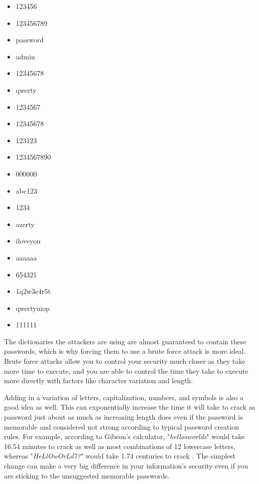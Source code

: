 \documentclass[acmsmall,nonacm]{acmart}
\begin{document}
\begin{center}
\begin{multicols}{5}
\begin{itemize}
    \item 123456
    \item 123456789
    \item password
    \item admin
    \item 12345678
    \item qwerty
    \item 1234567
    \item 12345678
    \item 123123
    \item 1234567890
    \item 000000
    \item abc123
    \item 1234
    \item azerty
    \item iloveyou
    \item aaaaaa
    \item 654321
    \item 1q2w3e4r5t
    \item qwertyuiop
    \item 111111
\end{itemize}
\end{multicols}
\end{center}

\noindent The dictionaries the attackers are using are almost guaranteed to contain these passwords, which is why forcing them to use a brute force attack is more ideal. Brute force attacks allow you to control your security much closer as they take more time to execute, and you are able to control the time they take to execute more directly with factors like character variation and length.
  
Adding in a variation of letters, capitalization, numbers, and symbols is also a good idea as well. This can exponentially increase the time it will take to crack as password just about as much as increasing length does even if the password is memorable and considered not strong according to typical password creation rules\cite{lee_2014}. For example, according to Gibson’s calculator, "\emph{hellosworlds}" would take 16.54 minutes to crack as well as most combinations of 12 lowercase letters, whereas "\emph{HeLlOwOrLd7?}" would take 1.74 centuries to crack \cite{rubenking_2021}. The simplest change can make a very big difference in your information's security even if you are sticking to the unsuggested memorable passwords.
\end{document}
